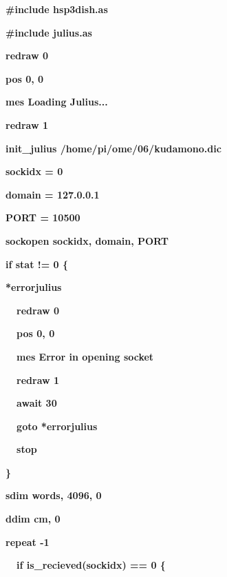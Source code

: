 \documentclass[a4paper,dvipdfmx]{jarticle}
\begin{document}
\centering
\begin{minipage}{17.006cm}
{\ttfamily\bfseries
\#include {\textquotedbl}hsp3dish.as{\textquotedbl}}

{\ttfamily\bfseries
\#include {\textquotedbl}julius.as{\textquotedbl}}


\bigskip

{\ttfamily\bfseries
redraw 0}

{\ttfamily\bfseries
pos 0, 0}

{\ttfamily\bfseries
mes {\textquotedbl}Loading Julius...{\textquotedbl}}

{\ttfamily\bfseries
redraw 1}


\bigskip

{\ttfamily\bfseries
init\_julius {\textquotedbl}/home/pi/ome/06/kudamono.dic{\textquotedbl}}


\bigskip

{\ttfamily\bfseries
sockidx = 0}

{\ttfamily\bfseries
domain = {\textquotedbl}127.0.0.1{\textquotedbl}}

{\ttfamily\bfseries
PORT = 10500}


\bigskip

{\ttfamily\bfseries
sockopen sockidx, domain, PORT}


\bigskip

{\ttfamily\bfseries
if stat != 0 \{}

{\ttfamily\bfseries
*errorjulius}

{\ttfamily\bfseries
\ \ redraw 0}

{\ttfamily\bfseries
\ \ pos 0, 0}

{\ttfamily\bfseries
\ \ mes {\textquotedbl}Error in opening socket{\textquotedbl}}

{\ttfamily\bfseries
\ \ redraw 1}

{\ttfamily\bfseries
\ \ await 30}

{\ttfamily\bfseries
\ \ goto *errorjulius}

{\ttfamily\bfseries
\ \ stop}

{\ttfamily\bfseries
\}}


\bigskip

{\ttfamily\bfseries
sdim words, 4096, 0}

{\ttfamily\bfseries
ddim cm, 0}


\bigskip

{\ttfamily\bfseries
repeat -1}

{\ttfamily\bfseries
\ \ if is\_recieved(sockidx) == 0 \{}


\end{minipage}
\end{document}
